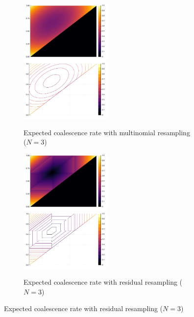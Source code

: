 \documentclass[fleqn]{article}
\theoremstyle{definition}
\begin{document}
\begin{figure}
	\centering
	\begin{subfigure}{\textwidth}
		\includegraphics[width=0.5\textwidth]{../residual_resampling/plots/EcN_mn_N3_heatmap.pdf}
		\includegraphics[width=0.5\textwidth]{../residual_resampling/plots/EcN_mn_N3_contour.pdf}
	\caption{Expected coalescence rate with multinomial resampling ($N=3$)}
	\end{subfigure}
	\begin{subfigure}{\textwidth}
		\includegraphics[width=0.5\textwidth]{../residual_resampling/plots/EcN_res_N3_heatmap.pdf}
		\includegraphics[width=0.5\textwidth]{../residual_resampling/plots/EcN_res_N3_contour.pdf}
	\caption{Expected coalescence rate with residual resampling ($N=3$)}

\end{subfigure}
\end{figure}
\end{document}
